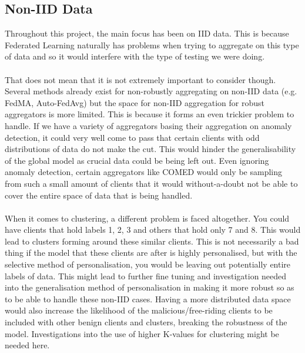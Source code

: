 \subsection{Non-IID Data}
Throughout this project, the main focus has been on IID data.
This is because Federated Learning naturally has problems when trying to aggregate on this type of data and so it would interfere with the type of testing we were doing.
\\ \\
That does not mean that it is not extremely important to consider though.
Several methods already exist for non-robustly aggregating on non-IID data (e.g. FedMA, Auto-FedAvg) but the space for non-IID aggregation for robust aggregators is more limited.
This is because it forms an even trickier problem to handle.
If we have a variety of aggregators basing their aggregation on anomaly detection, it could very well come to pass that certain clients with odd distributions of data do not make the cut.
This would hinder the generalisability of the global model as crucial data could be being left out.
Even ignoring anomaly detection, certain aggregators like COMED would only be sampling from such a small amount of clients that it would without-a-doubt not be able to cover the entire space of data that is being handled.
\\ \\
When it comes to clustering, a different problem is faced altogether.
You could have clients that hold labels 1, 2, 3 and others that hold only 7 and 8.
This would lead to clusters forming around these similar clients.
This is not necessarily a bad thing if the model that these clients are after is highly personalised, but with the selective method of personalisation, you would be leaving out potentially entire labels of data.
This might lead to further fine tuning and investigation needed into the generalisation method of personalisation in making it more robust so as to be able to handle these non-IID cases.
Having a more distributed data space would also increase the likelihood of the malicious/free-riding clients to be included with other benign clients and clusters, breaking the robustness of the model.
Investigations into the use of higher K-values for clustering might be needed here.

